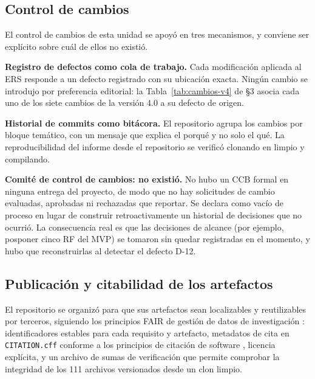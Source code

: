 \subsection{Control de cambios}

El control de cambios de esta unidad se apoy\'o en tres mecanismos, y conviene ser expl\'icito sobre cu\'al de ellos no existi\'o.

\textbf{Registro de defectos como cola de trabajo.} Cada modificaci\'on aplicada al ERS responde a un defecto registrado con su ubicaci\'on exacta. Ning\'un cambio se introdujo por preferencia editorial: la Tabla~\ref{tab:cambios-v4} de \S3 asocia cada uno de los siete cambios de la versi\'on 4.0 a su defecto de origen.

\textbf{Historial de commits como bit\'acora.} El repositorio agrupa los cambios por bloque tem\'atico, con un mensaje que explica el porqu\'e y no solo el qu\'e. La reproducibilidad del informe desde el repositorio se verific\'o clonando en limpio y compilando.

\textbf{Comit\'e de control de cambios: no existi\'o.} No hubo un CCB formal en ninguna entrega del proyecto, de modo que no hay solicitudes de cambio evaluadas, aprobadas ni rechazadas que reportar. Se declara como vac\'io de proceso en lugar de construir retroactivamente un historial de decisiones que no ocurri\'o. La consecuencia real es que las decisiones de alcance (por ejemplo, posponer cinco RF del MVP) se tomaron sin quedar registradas en el momento, y hubo que reconstruirlas al detectar el defecto D-12.

\subsection{Publicaci\'on y citabilidad de los artefactos}

El repositorio se organiz\'o para que sus artefactos sean localizables y reutilizables por terceros, siguiendo los principios FAIR de gesti\'on de datos de investigaci\'on \cite{wilkinson2016fair}: identificadores estables para cada requisito y artefacto, metadatos de cita en \texttt{CITATION.cff} conforme a los principios de citaci\'on de software \cite{smith2016software}, licencia expl\'icita, y un archivo de sumas de verificaci\'on que permite comprobar la integridad de los 111 archivos versionados desde un clon limpio.
